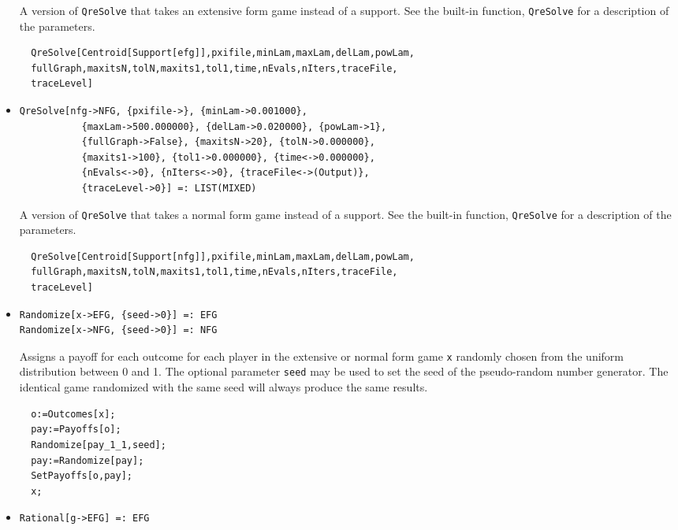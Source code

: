 \begin{itemize}
\bd 
A version of \verb+QreSolve+ that takes an extensive form
game instead of a support.  See the built-in function,
\verb+QreSolve+ for a description of the parameters.
\begin{verbatim}
  QreSolve[Centroid[Support[efg]],pxifile,minLam,maxLam,delLam,powLam, 
  fullGraph,maxitsN,tolN,maxits1,tol1,time,nEvals,nIters,traceFile,
  traceLevel]
\end{verbatim} 
\ed

\item{}
\protect \large \begin{verbatim}
QreSolve[nfg->NFG, {pxifile->}, {minLam->0.001000}, 
           {maxLam->500.000000}, {delLam->0.020000}, {powLam->1}, 
           {fullGraph->False}, {maxitsN->20}, {tolN->0.000000}, 
           {maxits1->100}, {tol1->0.000000}, {time<->0.000000}, 
           {nEvals<->0}, {nIters<->0}, {traceFile<->(Output)}, 
           {traceLevel->0}] =: LIST(MIXED) 
\end{verbatim}\normalsize

\bd 
A version of \verb+QreSolve+ that takes a normal form
game instead of a support.  See the built-in function,
\verb+QreSolve+ for a description of the parameters.
\begin{verbatim}
  QreSolve[Centroid[Support[nfg]],pxifile,minLam,maxLam,delLam,powLam,
  fullGraph,maxitsN,tolN,maxits1,tol1,time,nEvals,nIters,traceFile,
  traceLevel]
\end{verbatim} 
\ed


\item{}
\protect \large \begin{verbatim}
Randomize[x->EFG, {seed->0}] =: EFG 
Randomize[x->NFG, {seed->0}] =: NFG 
\end{verbatim}\normalsize

\bd 
Assigns a payoff for each outcome for each player in the extensive
or normal form game \verb+x+ randomly chosen from the uniform
distribution between 0 and 1.  The optional parameter \verb+seed+ may
be used to set the seed of the pseudo-random number generator.  The
identical game randomized with the same seed will always produce the
same results.
\begin{verbatim}
  o:=Outcomes[x];
  pay:=Payoffs[o];
  Randomize[pay_1_1,seed];
  pay:=Randomize[pay];
  SetPayoffs[o,pay];
  x;
\end{verbatim} 
\ed

\item{}
\protect \large \begin{verbatim}
Rational[g->EFG] =: EFG 
\end{verbatim}\normalsize


\end{itemize}
